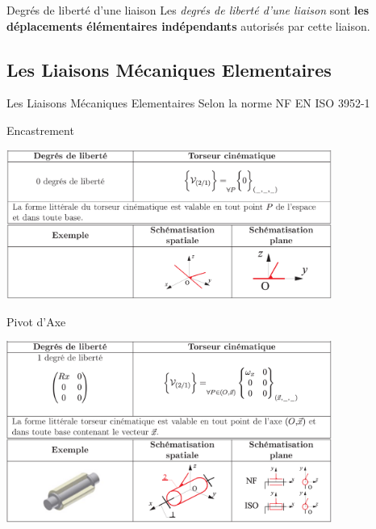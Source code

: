 \documentclass[
  ignorenonframetext,
  aspectratio=169,
  c]{beamer}
\begin{document}
\begin{frame}{Degrés de liberté d'une liaison}
Les \emph{degrés de liberté d'une liaison} sont \textbf{les déplacements
élémentaires indépendants} autorisés par cette liaison.
\end{frame}

\subsection{Les Liaisons Mécaniques
Elementaires}\label{les-liaisons-muxe9caniques-elementaires}

\begin{frame}{Les Liaisons Mécaniques Elementaires}
Selon la norme NF EN ISO 3952-1
\end{frame}

\begin{frame}{Encastrement}
\label{encastrement}
\begin{center}
\includegraphics[width=0.8\textwidth,height=\textheight]{CM3/Liaison-Encastrement.png}
\end{center}
\end{frame}

\begin{frame}{Pivot d'Axe}
\label{pivot-daxe}
\begin{center}
\includegraphics[width=0.8\textwidth,height=\textheight]{CM3/Liaison-Pivot.png}
\end{center}
\end{frame}
\end{document}
